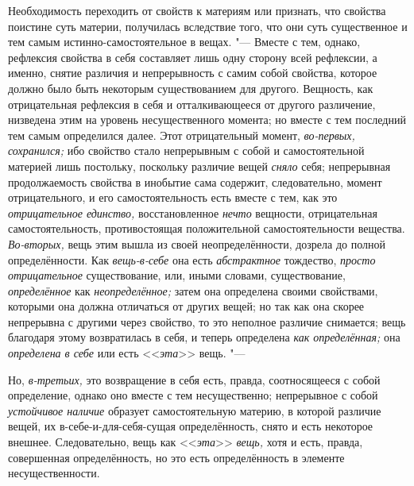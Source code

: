 Необходимость переходить от свойств к материям или признать, что свойства
поистине суть материи, получилась вследствие того, что они суть
существенное и тем самым истинно-самостоятельное в вещах. "--- Вместе с тем,
однако, рефлексия свойства в себя составляет лишь одну сторону всей
рефлексии, а именно, снятие различия и непрерывность с самим собой
свойства, которое должно было быть некоторым существованием для другого.
Вещность, как отрицательная рефлексия в себя и отталкивающееся от другого
различение, низведена этим на уровень несущественного момента; но вместе с
тем последний тем самым определился далее. Этот отрицательный момент,
{\em во-первых, сохранился;}
ибо свойство стало непрерывным с собой и самостоятельной материей лишь
постольку, поскольку различие вещей {\em сняло} себя;
непрерывная продолжаемость свойства в инобытие сама содержит,
следовательно, момент отрицательного, и его самостоятельность есть вместе с
тем, как это {\em отрицательное единство,}
восстановленное {\em нечто} вещности, отрицательная
самостоятельность, противостоящая положительной самостоятельности вещества.
{\em Во-вторых,} вещь этим вышла из своей
неопределённости, дозрела до полной определённости. Как
{\em вещь-в-себе} она есть {\em абстрактное} тождество,
{\em просто отрицательное} существование, или, иными
словами, существование, {\em определённое} как
{\em неопределённое;} затем она определена своими
свойствами, которыми она должна отличаться от других вещей; но так как она
скорее непрерывна с другими через свойство, то это неполное различие
снимается; вещь благодаря этому возвратилась в себя, и теперь определена
{\em как определённая;} она {\em определена в себе} или есть
<<{\em эта}>> вещь. "---

Но, {\em в-третьих,} это возвращение в себя есть,
правда, соотносящееся с собой определение, однако оно вместе с тем
несущественно; непрерывное с собой {\em устойчивое наличие}
образует самостоятельную материю, в которой различие вещей, их
в-себе-и-для-себя-сущая определённость, снято и есть некоторое внешнее.
Следовательно, вещь как <<{\em эта}>> {\em вещь,} хотя и
есть, правда, совершенная определённость, но это есть определённость в
элементе несущественности.

